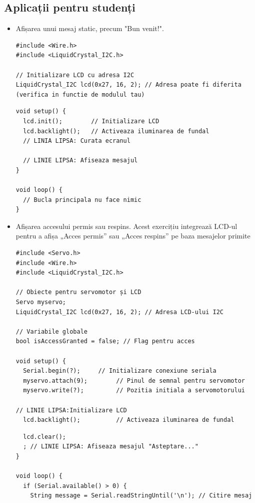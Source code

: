 \documentclass{report}
\begin{document}
\subsection*{Aplicații pentru studenți}
\begin{itemize}
    \item Afișarea unui mesaj static, precum "Bun venit!".
    \begin{lstlisting}
#include <Wire.h>
#include <LiquidCrystal_I2C.h>

// Initializare LCD cu adresa I2C
LiquidCrystal_I2C lcd(0x27, 16, 2); // Adresa poate fi diferita (verifica in functie de modulul tau)
\end{lstlisting}
\newpage
\vspace*{1cm}
\begin{lstlisting}
void setup() {
  lcd.init();        // Initializare LCD
  lcd.backlight();   // Activeaza iluminarea de fundal
  // LINIA LIPSA: Curata ecranul

  // LINIE LIPSA: Afiseaza mesajul
}

void loop() {
  // Bucla principala nu face nimic
}

    \end{lstlisting}
    \item Afișarea accesului permis sau respins. Acest exercițiu integrează LCD-ul pentru a afișa „Acces permis” sau „Acces respins” pe baza mesajelor primite
    \begin{lstlisting}
#include <Servo.h>
#include <Wire.h>
#include <LiquidCrystal_I2C.h>

// Obiecte pentru servomotor și LCD
Servo myservo;
LiquidCrystal_I2C lcd(0x27, 16, 2); // Adresa LCD-ului I2C

// Variabile globale
bool isAccessGranted = false; // Flag pentru acces

void setup() {
  Serial.begin(?);     // Initializare conexiune seriala
  myservo.attach(9);        // Pinul de semnal pentru servomotor
  myservo.write(?);         // Pozitia initiala a servomotorului

// LINIE LIPSA:Initializare LCD
  lcd.backlight();          // Activeaza iluminarea de fundal
\end{lstlisting}
\newpage
\vspace*{1cm}
\begin{lstlisting}
  lcd.clear();
  ; // LINIE LIPSA: Afiseaza mesajul "Asteptare..."
}

void loop() {
  if (Serial.available() > 0) {
    String message = Serial.readStringUntil('\n'); // Citire mesaj


\end{lstlisting}
\end{itemize}
\end{document}
